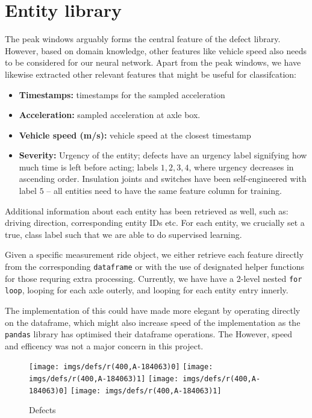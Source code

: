 \section{Entity library}
The peak windows arguably forms the central feature of the defect library. However, based on domain knowledge, other features like vehicle speed also needs to be considered for our neural network. Apart from the peak windows, we have likewise extracted other relevant features that might be useful for classifcation:
\begin{itemize}
	\item \textbf{Timestamps:} timestamps for the sampled acceleration
	\item \textbf{Acceleration:} sampled acceleration at axle box.
	\item \textbf{Vehicle speed (m/s):} vehicle speed at the closest timestamp
	\item \textbf{Severity:} Urgency of the entity; defects have an urgency label signifying how much time is left before acting; labels $1,2,3,4$, where urgency decreases in ascending order. Insulation joints and switches have been self-engineered with label $5$ -- all entities need to have the same feature column for training.
\end{itemize}
Additional information about each entity has been retrieved as well, such as: driving direction, corresponding entity IDs etc. For each entity, we crucially set a true, class label such that we are able to do supervised learning.

Given a specific measurement ride object, we either retrieve each feature directly from the corresponding \verb|dataframe| or with the use of designated helper functions for those requring extra processing. Currently, we have have a 2-level nested \verb|for loop|, looping for each axle outerly, and looping for each entity entry innerly.

The implementation of this could have made more elegant by operating directly on the dataframe, which might also increase speed of the implementation as the \verb|pandas| library has optimised their dataframe operations. The However, speed and efficency was not a major concern in this project. 

\begin{figure}[H]
	\centering
	\texttt{[image: imgs/defs/r(400,A-184063)0]}
	\texttt{[image: imgs/defs/r(400,A-184063)1]}
	\texttt{[image: imgs/defs/r(400,A-184063)0]}
	\texttt{[image: imgs/defs/r(400,A-184063)1]}
	\caption{Defects}
\end{figure}

